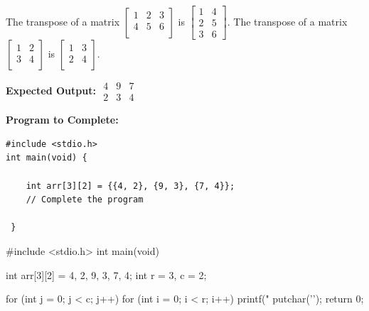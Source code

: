 \documentclass[12pt, a4paper, answers, addpoints]{exam}
\begin{document}
\begin{questions}
{The transpose of a matrix
 $\begin{bmatrix}
  1 & 2 & 3\\ 
  4 & 5 & 6\\
\end{bmatrix}$ is 
 $\begin{bmatrix}
  1 & 4\\ 
  2 & 5\\
  3 & 6
\end{bmatrix}$.
The transpose of a matrix
 $\begin{bmatrix}
  1 & 2 \\ 
  3 & 4 \\
\end{bmatrix}$ is 
 $\begin{bmatrix}
  1 & 3\\ 
  2 & 4\\
\end{bmatrix}$.


\textbf{Expected Output:}  
$\begin{matrix}
    4 & 9 & 7 \\
    2 & 3 & 4 
\end{matrix}$ 

\textbf{Program to Complete:}
\begin{lstlisting}[basicstyle=\small\ttfamily]
#include <stdio.h>
int main(void) {

    int arr[3][2] = {{4, 2}, {9, 3}, {7, 4}};
    // Complete the program 
    
 }
\end{lstlisting}

}

\begin{CcodeSol}
#include <stdio.h>
int main(void) {

    int arr[3][2] = {{4, 2}, {9, 3}, {7, 4}};
    int r = 3, c = 2;
    
     for (int j = 0; j < c; j++) {
         for (int i = 0; i < r; i++) {
             printf("%
         }
         putchar('\n');
     }
     return 0;
 }
\end{CcodeSol}



\end{questions}
\end{document}
